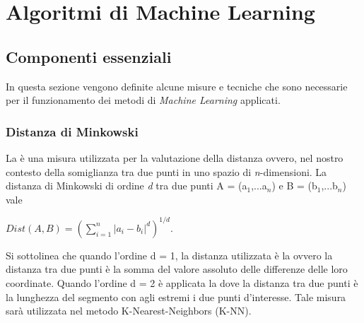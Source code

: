 
\chapter{Algoritmi di Machine Learning}
\label{cap:ML}
\section{Componenti essenziali}
In questa sezione vengono definite alcune misure e tecniche che sono necessarie per il funzionamento dei metodi di \emph{Machine Learning} applicati.
\subsection{Distanza di Minkowski}
La \textit{\cite{minkdist}} è una misura utilizzata per la valutazione della distanza ovvero, nel nostro contesto della somiglianza tra due punti in uno spazio di \textit{n}-dimensioni. La distanza di Minkowski di ordine \emph{d} tra due punti A = (a$_1$,...a$_n$) e B = (b$_1$,...b$_n$) vale
\begin{center}
	$Dist(A,B) =  \left(\sum_{i = 1}^{n}|a_i-b_i|^d\right)^{1/d} $.
\end{center}

Si sottolinea che quando l'ordine d = 1, la distanza utilizzata è la \textit{\cite{manhattan}} ovvero la distanza tra due punti è la somma del valore assoluto delle differenze delle loro coordinate. Quando l'ordine d = 2 è applicata la \textit{\cite{euclidea}} dove la distanza tra due punti è la lunghezza del segmento con agli estremi i due punti d'interesse.
Tale misura sarà utilizzata nel metodo K-Nearest-Neighbors (K-NN).

